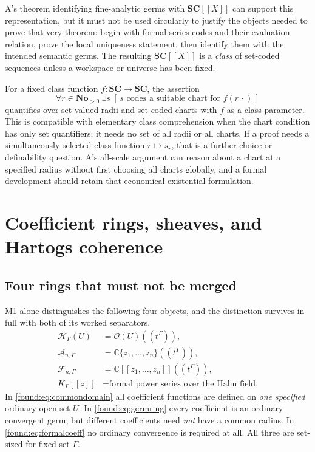 \documentclass[11pt,letterpaper]{article}
\numberwithin{equation}{section}
\theoremstyle{definition}
\theoremstyle{remark}
\newcommand{\No}{\mathbf{No}}
\newcommand{\SC}{\mathbf{SC}}
\newcommand{\C}{\mathbb C}
\newcommand{\OO}{\mathcal O}
\newcommand{\HH}{\mathcal H}
\newcommand{\Ag}{\mathscr A}
\newcommand{\Fg}{\mathscr F}
\begin{document}
A's theorem identifying fine-analytic germs with $\SC[[X]]$ can support this
representation, but it must not be used circularly to justify the objects needed
to prove that very theorem: begin with formal-series codes and their evaluation
relation, prove the local uniqueness statement, then identify them with the
intended semantic germs. The resulting $\SC[[X]]$ is a \emph{class} of set-coded
sequences unless a workspace or universe has been fixed.

For a fixed class function $f:\SC\to\SC$, the assertion
\[
 \forall r\in\No_{>0}\ \exists s\;
 [\,s\text{ codes a suitable chart for }f(r\,\cdot)\,]
\]
quantifies over set-valued radii and set-coded charts with $f$ as a class
parameter. This is compatible with elementary class comprehension when the chart
condition has only set quantifiers; it needs no set of all radii or all charts.
If a proof needs a simultaneously selected class function $r\mapsto s_r$, that is
a further choice or definability question. A's all-scale argument can reason
about a chart at a specified radius without first choosing all charts globally,
and a formal development should retain that economical existential formulation.

\section{Coefficient rings, sheaves, and Hartogs coherence}
\label{found:sec:sheaves}

\subsection{Four rings that must not be merged}
\label{found:sub:fourrings}
M1 alone distinguishes the following four objects, and the distinction survives
in full with both of its worked separators.
\begin{align}
 \HH_\Gamma(U)&=\OO(U)((t^\Gamma)),\label{found:eq:commondomain}\\
 \Ag_{n,\Gamma}&=\C\{z_1,\ldots,z_n\}((t^\Gamma)),\label{found:eq:germring}\\
 \Fg_{n,\Gamma}&=\C[[z_1,\ldots,z_n]]((t^\Gamma)),\label{found:eq:formalcoeff}\\
 K_\Gamma[[z]]&=\text{formal power series over the Hahn field.}
 \label{found:eq:khahn}
\end{align}
In \eqref{found:eq:commondomain} all coefficient functions are defined on
\emph{one specified} ordinary open set $U$. In \eqref{found:eq:germring} every
coefficient is an ordinary convergent germ, but different coefficients need
\emph{not} have a common radius. In \eqref{found:eq:formalcoeff} no ordinary
convergence is required at all. All three are set-sized for fixed set $\Gamma$.
\end{document}
